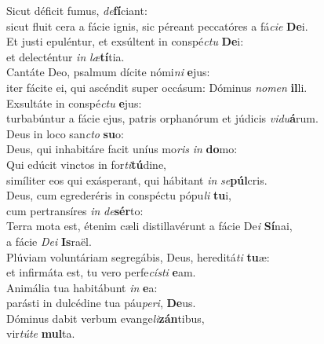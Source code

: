 \evenverse Sicut déficit fumus, \textit{de}\textbf{fí}ciant:~\*\\
\evenverse sicut fluit cera a fácie ignis, sic péreant peccatóres a fá\textit{ci}\textit{e} \textbf{De}i.\\
\oddverse Et justi epuléntur, et exsúltent in conspé\textit{ctu} \textbf{De}i:~\*\\
\oddverse et delecténtur \textit{in} \textit{læ}\textbf{tí}tia.\\
\evenverse Cantáte Deo, psalmum dícite nómi\textit{ni} \textbf{e}jus:~\*\\
\evenverse iter fácite ei, qui ascéndit super occásum: Dóminus \textit{no}\textit{men} \textbf{il}li.\\
\oddverse Exsultáte in conspé\textit{ctu} \textbf{e}jus:~\*\\
\oddverse turbabúntur a fácie ejus, patris orphanórum et júdicis \textit{vi}\textit{du}\textbf{á}rum.\\
\evenverse Deus in loco san\textit{cto} \textbf{su}o:~\*\\
\evenverse Deus, qui inhabitáre facit uníus mo\textit{ris} \textit{in} \textbf{do}mo:\\
\oddverse Qui edúcit vinctos in for\textit{ti}\textbf{tú}dine,~\*\\
\oddverse simíliter eos qui exásperant, qui hábitant \textit{in} \textit{se}\textbf{púl}cris.\\
\evenverse Deus, cum egrederéris in conspéctu pópu\textit{li} \textbf{tu}i,~\*\\
\evenverse cum pertransíres \textit{in} \textit{de}\textbf{sér}to:\\
\oddverse Terra mota est, étenim cæli distillavérunt a fácie De\textit{i} \textbf{Sí}nai,~\*\\
\oddverse a fácie \textit{De}\textit{i} \textbf{Is}raël.\\
\evenverse Plúviam voluntáriam segregábis, Deus, hereditá\textit{ti} \textbf{tu}æ:~\*\\
\evenverse et infirmáta est, tu vero perfe\textit{cí}\textit{sti} \textbf{e}am.\\
\oddverse Animália tua habitábunt \textit{in} \textbf{e}a:~\*\\
\oddverse parásti in dulcédine tua páu\textit{pe}\textit{ri}, \textbf{De}us.\\
\evenverse Dóminus dabit verbum evange\textit{li}\textbf{zán}tibus,~\*\\
\evenverse vir\textit{tú}\textit{te} \textbf{mul}ta.\\
